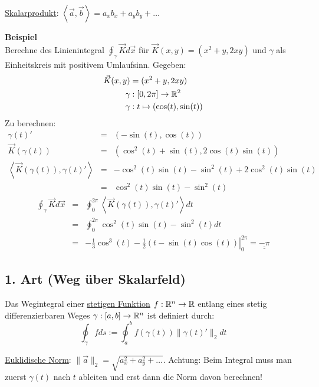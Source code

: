 \underline{Skalarprodukt}: $\left< \vec{a}, \vec{b} \right> = a_x b_x + a_y b_y + \ldots$

\textbf{Beispiel}\\
Berechne des Linienintegral $\oint_\gamma \vec{K} d\vec{x} $ für $ \vec{K}(x,y) = (x^2+y, 2xy)$ und $\gamma$ als Einheitskreis mit positivem Umlaufsinn.
Gegeben:
\begin{align*}
\vec{K}(x,y) &= (x^2+y, 2xy) \\
\gamma &: [0,2\pi]  \to \mathbb{R}^2\\
\gamma &: t \mapsto   (\cos(t), \sin(t)) 
\end{align*}
Zu berechnen:
\begin{eqnarray*}
\gamma(t)' &=& (-\sin(t),\cos(t))\\
\vec{K}(\gamma(t)) &=& (\cos^2(t) + \sin(t), 2 \cos(t)\sin(t))\\
\left< \vec{K}(\gamma(t)), \gamma(t)' \right> &=& -\cos^2(t)\sin(t) - \sin^2(t)
+ 2\cos^2(t)\sin(t)\\
 &=& \cos^2(t)\sin(t) - \sin^2(t)
\end{eqnarray*}
\begin{eqnarray*}
\oint_\gamma \vec{K} d\vec{x} &=& \oint_0^{2\pi} \left< \vec{K}(\gamma(t)), \gamma(t)' \right> dt\\
&=& \oint_0^{2\pi} \cos^2(t)\sin(t) - \sin^2(t) dt\\
&=& \left. -\frac{1}{3}\cos^3(t) - \frac{1}{2}(t - \sin(t)\cos(t))
\right|_0^{2\pi} = \underline{\underline{-\pi}}
\end{eqnarray*}

\subsection{1. Art (Weg über Skalarfeld)}
Das Wegintegral einer \underline{stetigen Funktion} $f: \mathbb{R}^n \to \mathbb{R}$ entlang
eines stetig differenzierbaren Weges $\gamma: [a,b] \to \mathbb{R}^n$ ist definiert durch:
\[
\oint_\gamma f ds := \oint_a^b f(\gamma(t)) \|\gamma(t)'\|_2 dt
\]

\underline{Euklidische Norm}: $\|\vec{a}\|_2 = \sqrt{a_x^2 + a_y^2 + \ldots}$.
Achtung: Beim Integral muss man zuerst $\gamma(t)$ nach $t$ ableiten und erst
dann die Norm davon berechnen!

